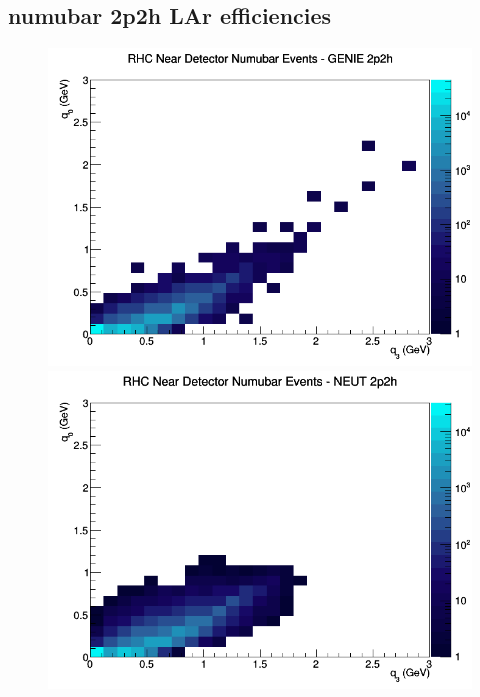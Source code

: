 \documentclass[12pt]{article}
\begin{document}
\subsection{numubar 2p2h LAr efficiencies}
\begin{figure}[h]
\includegraphics[width=\linewidth]{eff_q0_q3/LAr/2p2h_RHC_ND_numubar_q3_q0_GENIE.png}
\endminipage
{}
\includegraphics[width=\linewidth]{eff_q0_q3/LAr/2p2h_RHC_ND_numubar_q3_q0_NEUT.png}
\endminipage
{}

\end{figure}
\end{document}
